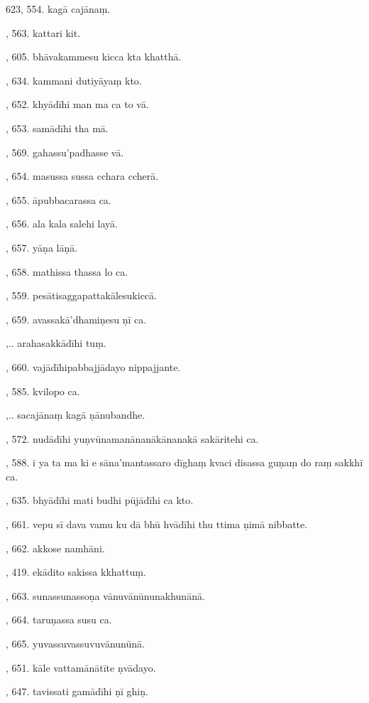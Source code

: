 623, 554. kagā cajānaṃ.\par {}, 563. kattari kit.\par {}, 605. bhāvakammesu kicca kta khatthā.\par {}, 634. kammani dutiyāyaṃ kto.\par {}, 652. khyādīhi man ma ca to vā.\par {}, 653. samādīhi tha mā.\par {}, 569. gahassu’padhasse vā.\par {}, 654. masussa sussa cchara ccherā.\par {}, 655. āpubbacarassa ca.\par {}, 656. ala kala salehi layā.\par {}, 657. yāṇa lāṇā.\par {}, 658. mathissa thassa lo ca.\par {}, 559. pesātisaggapattakālesukiccā.\par {}, 659. avassakā’dhamiṇesu ṇī ca.\par {},.. arahasakkādīhi tuṃ.\par {}, 660. vajādīhipabbajjādayo nippajjante.\par {}, 585. kvilopo ca.\par {},.. sacajānaṃ kagā ṇānubandhe.\par {}, 572. nudādīhi yuṇvūnamanānanākānanakā sakāritehi ca.\par {}, 588. i ya ta ma ki e sāna’mantassaro dīghaṃ kvaci disassa guṇaṃ do raṃ sakkhī ca.\par {}, 635. bhyādīhi mati budhi pūjādīhi ca kto.\par {}, 661. vepu sī dava vamu ku dā bhū hvādīhi thu ttima ṇimā nibbatte.\par {}, 662. akkose namhāni.\par {}, 419. ekādito sakissa kkhattuṃ.\par {}, 663. sunassunassoṇa vānuvānūnunakhunānā.\par {}, 664. taruṇassa susu ca.\par {}, 665. yuvassuvassuvuvānunūnā.\par {}, 651. kāle vattamānātīte ṇvādayo.\par {}, 647. tavissati gamādīhi ṇī ghiṇ.\par \noindent
